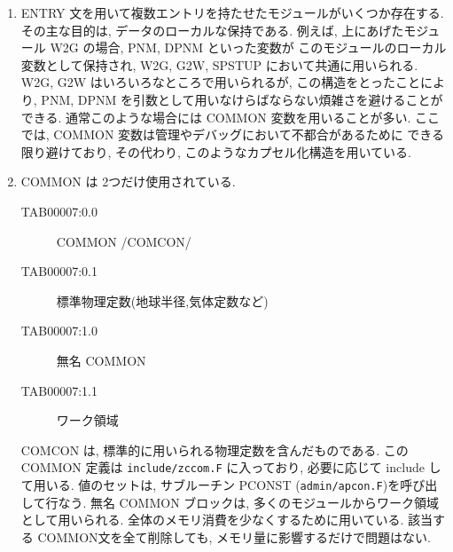 \begin{enumerate}
\item ENTRY 文を用いて複数エントリを持たせたモジュールがいくつか存在する.
その主な目的は, データのローカルな保持である.
例えば, 上にあげたモジュール W2G の場合, PNM, DPNM といった変数が
このモジュールのローカル変数として保持され,
W2G, G2W, SPSTUP において共通に用いられる.
W2G, G2W はいろいろなところで用いられるが, この構造をとったことにより,
PNM, DPNM を引数として用いなけらばならない煩雑さを避けることができる.
通常このような場合には COMMON 変数を用いることが多い.
ここでは, COMMON 変数は管理やデバッグにおいて不都合があるために
できる限り避けており, その代わり, このようなカプセル化構造を用いている.

\item COMMON は 2つだけ使用されている.
\begin{center}
  \begin{description}
\item[TAB00007:0.0] COMMON /COMCON/
\item[TAB00007:0.1] 標準物理定数(地球半径,気体定数など)
\item[TAB00007:1.0] 無名 COMMON
\item[TAB00007:1.1] ワーク領域
\end{description}
\end{center}
COMCON は, 標準的に用いられる物理定数を含んだものである.
この COMMON 定義は {\tt include/zccom.F} に入っており,
必要に応じて include して用いる. 
値のセットは,  サブルーチン PCONST ({\tt admin/apcon.F})を呼び出して行なう.
%
無名 COMMON ブロックは, 多くのモジュールからワーク領域として用いられる.
全体のメモリ消費を少なくするために用いている.
該当する COMMON文を全て削除しても, メモリ量に影響するだけで問題はない.


\end{enumerate}
